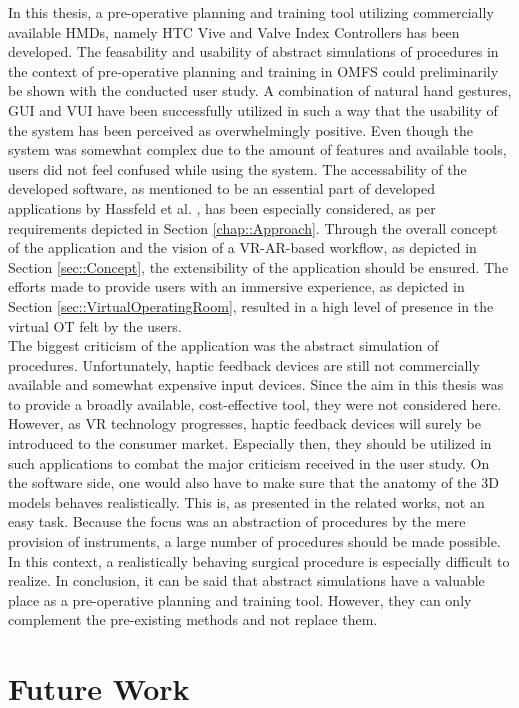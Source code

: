 In this thesis, a pre-operative planning and training tool utilizing
commercially available HMDs, namely HTC Vive and Valve Index Controllers
has been developed. The feasability and usability of 
abstract simulations of procedures in the context of pre-operative planning
and training in OMFS could preliminarily be shown with the conducted user study.
A combination of natural hand gestures, GUI and VUI have been
successfully utilized in such a way that the usability
of the system has been perceived as overwhelmingly positive.
Even though the system was somewhat complex due to the amount of features 
and available tools, users did not feel confused while using the system.
The accessability of the developed software, 
as mentioned to be an essential part of developed applications by
Hassfeld et al. \cite{HASSFELD20012}, has been especially considered,
as per requirements depicted in Section \ref{chap::Approach}.
Through the overall concept of the application and the vision of a VR-AR-based workflow, as depicted in Section 
\ref{sec::Concept}, the extensibility of the application should be ensured. 
The efforts made to provide users with an immersive experience,
as depicted in Section \ref{sec::VirtualOperatingRoom},
resulted in a high level of presence in the virtual OT felt by the users.
\\ The biggest criticism of the application was the abstract 
simulation of procedures. Unfortunately, haptic feedback devices are still
not commercially available and somewhat expensive input devices. Since
the aim in this thesis was to provide a broadly available, cost-effective
tool, they were not considered here. However, as VR technology progresses,
haptic feedback devices will surely be introduced to the consumer market.
Especially then, they should be utilized in such applications to combat
the major criticism received in the user study.
On the software side, one would also have to make sure that 
the anatomy of the 3D models behaves realistically. This is, as 
presented in the related works, not an easy task. 
Because the focus was an abstraction of procedures by the mere provision 
of instruments, a large number of procedures should be made possible.
In this context, a realistically behaving surgical procedure is
especially difficult to realize.
In conclusion, it can be said that abstract simulations have a valuable
place as a pre-operative planning and training tool. However, they 
can only complement the pre-existing methods and not replace them.
 
\section{Future Work}






